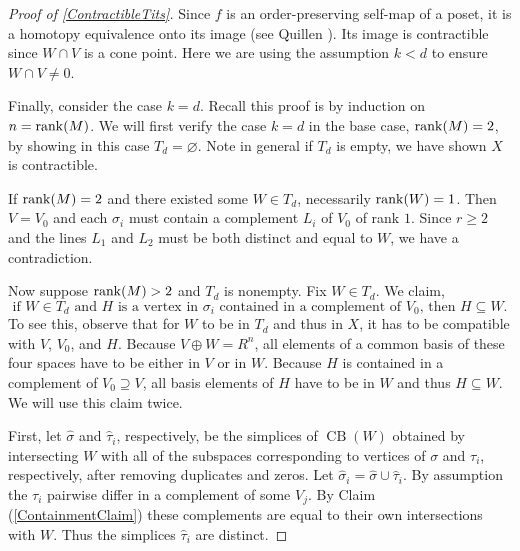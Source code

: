 \documentclass[a4paper]{amsart}
\DeclareMathOperator{\CB}{CB}
\numberwithin{theoremcounter}{section}
\theoremstyle{definition}
\theoremstyle{remark}
\newcommand{\mr}[1]{{\rm #1}}
\newcommand{\rank}{\mr{rank}}
\begin{document}
\begin{proof}[Proof of \autoref{ContractibleTits}]
Since $f$ is an order-preserving self-map of a poset, it is a homotopy equivalence onto its image (see Quillen \cite[1.3 ``Homotopy Property"]{Quillen-Poset}). Its image is contractible since $W \cap V$ is a cone point. Here we are using the assumption $k<d$ to ensure $W \cap V \neq 0$. 


Finally, consider the case $k=d$. Recall this proof is by induction on $n=\rank(M)$. We will first verify the case $k=d$ in the base case, $\rank(M)=2$, by showing in this case $T_d = \varnothing$. Note in general if $T_d$ is empty, we have shown $X$ is contractible. 

If $\rank(M)=2$ and there existed some $W \in T_d$, necessarily $\rank(W)=1$. Then $V=V_0$ and each $\sigma_i$ must contain a complement $L_i$ of $V_0$ of rank $1$. Since $r \geq 2$ and the lines $L_1$ and $L_2$ must be both distinct and equal to $W$, we have a contradiction. 


Now suppose $\rank(M) > 2$ and $T_d$ is nonempty. Fix $W \in T_d$. We claim, 
\begin{equation}\label{ContainmentClaim}
\text{if $W\in T_d$ and $H$ is a vertex in $\sigma_i$ contained in a complement of $V_0$, then $H \subseteq W$.}
\end{equation} 
To see this, observe that for $W$ to be in $T_d$ and thus in $X$, it has to be compatible with $V$, $V_0$, and $H$. Because $V \oplus W = R^n$, all elements of a common basis of these four spaces have to be either in $V$ or in $W$. Because $H$ is contained in a complement of $V_0 \supseteq V$, all basis elements of $H$ have to be in $W$ and thus $H \subseteq W$.
We will use this claim twice. 

First, let $\hat \sigma$ and $\hat \tau_i$, respectively, be the simplices of ${\CB}(W)$ obtained by intersecting $W$ with all of the subspaces corresponding to vertices of $\sigma$ and $\tau_i$, respectively, after removing duplicates and zeros. Let $\hat \sigma_i = \hat \sigma \cup \hat \tau_i$.  By assumption the $\tau_i$ pairwise differ in a complement of some $V_j$. By Claim (\ref{ContainmentClaim})  these complements are equal to their own intersections with $W$. Thus the simplices $ \hat \tau_i$ are distinct. 


\end{proof}
\end{document}
